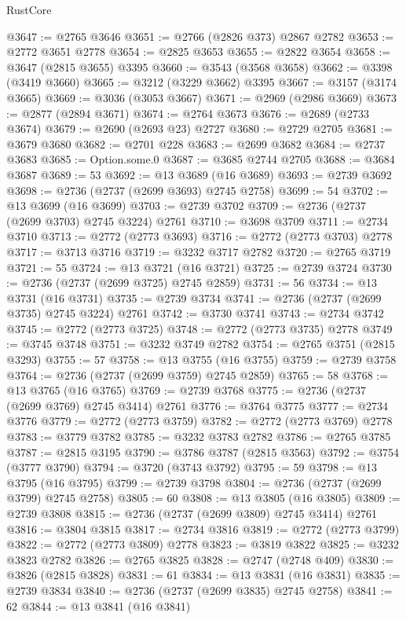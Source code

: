 \begin{lexlean}{RustCore}
\begin{coremodule}
@3647 := @2765 @3646
@3651 := @2766 (@2826 @373) @2867 @2782
@3653 := @2772 @3651 @2778
@3654 := @2825 @3653
@3655 := @2822 @3654
@3658 := @3647 (@2815 @3655) @3395
@3660 := @3543 (@3568 @3658)
@3662 := @3398 (@3419 @3660)
@3665 := @3212 (@3229 @3662) @3395
@3667 := @3157 (@3174 @3665)
@3669 := @3036 (@3053 @3667)
@3671 := @2969 (@2986 @3669)
@3673 := @2877 (@2894 @3671)
@3674 := @2764 @3673
@3676 := @2689 (@2733 @3674)
@3679 := @2690 (@2693 @23) @2727
@3680 := @2729 @2705
@3681 := @3679 @3680
@3682 := @2701 @228
@3683 := @2699 @3682
@3684 := @2737 @3683
@3685 := Option.some.{0}
@3687 := @3685 @2744 @2705
@3688 := @3684 @3687
@3689 := 53
@3692 := @13 @3689 (@16 @3689)
@3693 := @2739 @3692
@3698 := @2736 (@2737 (@2699 @3693) @2745 @2758)
@3699 := 54
@3702 := @13 @3699 (@16 @3699)
@3703 := @2739 @3702
@3709 := @2736 (@2737 (@2699 @3703) @2745 @3224) @2761
@3710 := @3698 @3709
@3711 := @2734 @3710
@3713 := @2772 (@2773 @3693)
@3716 := @2772 (@2773 @3703) @2778
@3717 := @3713 @3716
@3719 := @3232 @3717 @2782
@3720 := @2765 @3719
@3721 := 55
@3724 := @13 @3721 (@16 @3721)
@3725 := @2739 @3724
@3730 := @2736 (@2737 (@2699 @3725) @2745 @2859)
@3731 := 56
@3734 := @13 @3731 (@16 @3731)
@3735 := @2739 @3734
@3741 := @2736 (@2737 (@2699 @3735) @2745 @3224) @2761
@3742 := @3730 @3741
@3743 := @2734 @3742
@3745 := @2772 (@2773 @3725)
@3748 := @2772 (@2773 @3735) @2778
@3749 := @3745 @3748
@3751 := @3232 @3749 @2782
@3754 := @2765 @3751 (@2815 @3293)
@3755 := 57
@3758 := @13 @3755 (@16 @3755)
@3759 := @2739 @3758
@3764 := @2736 (@2737 (@2699 @3759) @2745 @2859)
@3765 := 58
@3768 := @13 @3765 (@16 @3765)
@3769 := @2739 @3768
@3775 := @2736 (@2737 (@2699 @3769) @2745 @3414) @2761
@3776 := @3764 @3775
@3777 := @2734 @3776
@3779 := @2772 (@2773 @3759)
@3782 := @2772 (@2773 @3769) @2778
@3783 := @3779 @3782
@3785 := @3232 @3783 @2782
@3786 := @2765 @3785
@3787 := @2815 @3195
@3790 := @3786 @3787 (@2815 @3563)
@3792 := @3754 (@3777 @3790)
@3794 := @3720 (@3743 @3792)
@3795 := 59
@3798 := @13 @3795 (@16 @3795)
@3799 := @2739 @3798
@3804 := @2736 (@2737 (@2699 @3799) @2745 @2758)
@3805 := 60
@3808 := @13 @3805 (@16 @3805)
@3809 := @2739 @3808
@3815 := @2736 (@2737 (@2699 @3809) @2745 @3414) @2761
@3816 := @3804 @3815
@3817 := @2734 @3816
@3819 := @2772 (@2773 @3799)
@3822 := @2772 (@2773 @3809) @2778
@3823 := @3819 @3822
@3825 := @3232 @3823 @2782
@3826 := @2765 @3825
@3828 := @2747 (@2748 @409)
@3830 := @3826 (@2815 @3828)
@3831 := 61
@3834 := @13 @3831 (@16 @3831)
@3835 := @2739 @3834
@3840 := @2736 (@2737 (@2699 @3835) @2745 @2758)
@3841 := 62
@3844 := @13 @3841 (@16 @3841)

\end{coremodule}
\end{lexlean}
